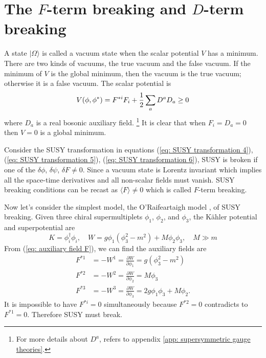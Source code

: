 \documentclass[12pt]{report}
\begin{document}
\section{The $F$-term breaking and $D$-term breaking}
A state $| \Omega \rangle$ is called a vacuum state when the scalar potential $V$ has a minimum.
There are two kinds of vacuums, the true vacuum and the false vacuum.
If the minimum of $V$ is the global minimum, then the vacuum is the true vacuum; otherwise it is a false vacuum.
The scalar potential is
\begin{equation}
V(\phi, \phi^{*}) = F^{*i} F_{i} + \frac{1}{2} \sum_{a} D^{a} D_{a} \ge 0 \notag
\end{equation}
where $D_{a}$ is a real bosonic auxiliary field. \footnote{For more details about $D^{a}$, refers to appendix \ref{app: supersymmetric gauge theories}.}
It is clear that when $F_{i} = D_{a} = 0$ then $V = 0$ is a global minimum.

Consider the SUSY transformation in equations (\ref{eq: SUSY transformation 4}), (\ref{eq: SUSY transformation 5}), (\ref{eq: SUSY transformation 6}), SUSY is broken if one of the $\delta \phi$, $\delta \psi$, $\delta F \neq 0$.
Since a vacuum state is Lorentz invariant which implies all the space-time derivatives and all non-scalar fields must vanish.
SUSY breaking conditions can be recast as $\langle F \rangle \neq 0$ which is called $F$-term breaking.

Now let's consider the simplest model, the O'Raifeartaigh model \cite{O_Raifeartaigh},  of SUSY breaking. Given three chiral supermultiplets $\phi_{1}$, $\phi_{2}$, and $\phi_{3}$, the K\"{a}hler potential and superpotential are 
\begin{equation}
K = \phi^{\dag}_{i} \phi_{i}, \quad
W = g \phi_{1} ( \phi^{2}_{3} - m^{2}) + M \phi_{2} \phi_{3}, \quad
M \gg m
\end{equation}
From (\ref{eq: auxiliary field F}), we can find the auxiliary fields are
\begin{align}
F^{*1} &= - W^{1} = \frac{\partial W}{\partial \phi_{1}} = g ( \phi^{2}_{3} - m^{2})\\
F^{*2} &= - W^{2} = \frac{\partial W}{\partial \phi_{2}} = M \phi_{3}\\
F^{*3} &= - W^{3} = \frac{\partial W}{\partial \phi_{3}} = 2 g \phi_{1} \phi_{3} + M \phi_{2} .
\end{align}
It is impossible to have $F^{*i} = 0$ simultaneously because $F^{*2} = 0$ contradicts to $F^{*1} = 0$.
Therefore SUSY must break.
\end{document}
